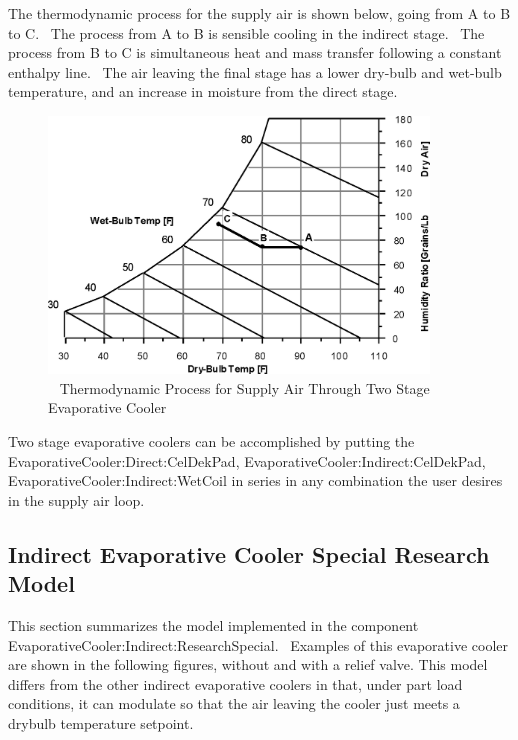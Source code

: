 The thermodynamic process for the supply air is shown below, going from A to B to C.~ The process from A to B is sensible cooling in the indirect stage.~ The process from B to C is simultaneous heat and mass transfer following a constant enthalpy line.~ The air leaving the final stage has a lower dry-bulb and wet-bulb temperature, and an increase in moisture from the direct stage.

\begin{figure}[hbtp] %
\centering
\includegraphics[width=0.9\textwidth, height=0.9\textheight, keepaspectratio=true]{media/image4807.png}
\caption{  Thermodynamic Process for Supply Air Through Two Stage Evaporative Cooler \protect \label{fig:thermodynamic-process-for-supply-air-through}}
\end{figure}

Two stage evaporative coolers can be accomplished by putting the EvaporativeCooler:Direct:CelDekPad, EvaporativeCooler:Indirect:CelDekPad, EvaporativeCooler:Indirect:WetCoil in series in any combination the user desires in the supply air loop.

\subsection{Indirect Evaporative Cooler Special Research Model}\label{indirect-evaporative-cooler-special-research-model}

This section summarizes the model implemented in the component EvaporativeCooler:Indirect:ResearchSpecial.~ Examples of this evaporative cooler are shown in the following figures, without and with a relief valve. This model differs from the other indirect evaporative coolers in that, under part load conditions, it can modulate so that the air leaving the cooler just meets a drybulb temperature setpoint.

